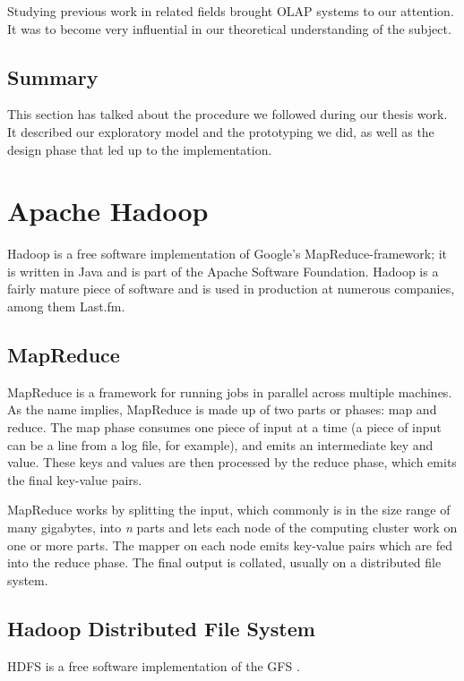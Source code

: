 Studying previous work in related fields brought OLAP systems to our attention.
It was to become very influential in our theoretical understanding of the
subject.

\subsection*{Summary}

This section has talked about the procedure we followed during our thesis work. It described our exploratory model and the prototyping we did, as well as the design phase that led up to the implementation.



\section{Apache Hadoop}

Hadoop is a free software implementation of Google's MapReduce-framework; it is
written in Java and is part of the Apache Software Foundation. Hadoop is a
fairly mature piece of software and is used in production at numerous companies,
among them Last.fm.
\cite{hadoop}


\subsection{MapReduce}

MapReduce is a framework for running jobs in parallel across multiple
machines. As the name implies, MapReduce is made up of two parts or
phases: map and reduce. The map phase consumes one piece of input at a
time (a piece of input can be a line from a log file, for example), and
emits an intermediate key and value. These keys and values are then
processed by the reduce phase, which emits the final key-value pairs.

MapReduce works by splitting the input, which commonly is in the size
range of many gigabytes, into \textit{n} parts and lets each node of the
computing cluster work on one or more parts. The mapper on each node emits
key-value pairs which are fed into the reduce phase. The final output is
collated, usually on a distributed file system.


\subsection*{Hadoop Distributed File System}

HDFS is a free software implementation of the GFS \cite{gfs}.

